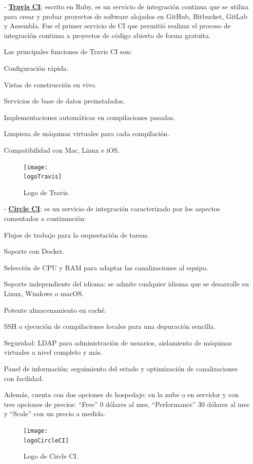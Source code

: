 \newpage

- \textbf{\underline{Travis CI}}: escrito en Ruby, es un servicio de integración continua que se utiliza para crear y probar proyectos de software alojados en GitHub, Bitbucket, GitLab y Assembla. Fue el primer servicio de CI que permitió realizar el proceso de integración continua a proyectos de código abierto de forma gratuita.

Las principales funciones de Travis CI son:
\begin{compactitem}
    \item Configuración rápida.
    \item Vistas de construcción en vivo.
    \item Servicios de base de datos preinstalados.
    \item Implementaciones automáticas en compilaciones pasadas.
    \item Limpieza de máquinas virtuales para cada compilación.
    \item Compatibilidad con Mac, Linux e iOS.
\end{compactitem}

\begin{figure}[h]
    \centering
    \texttt{[image: \\logoTravis]}
    \caption{Logo de Travis.}
\end{figure}

- \textbf{\underline{Circle CI}}: es un servicio de integración caracterizado por los aspectos comentados a continuación:
\begin{compactitem}
    \item Flujos de trabajo para la orquestación de tareas.
    \item Soporte con Docker.
    \item Selección de CPU y RAM para adaptar las canalizaciones al equipo.
    \item Soporte independiente del idioma: se admite cualquier idioma que se desarrolle en Linux, Windows o macOS.
    \item Potente almacenamiento en caché.
    \item SSH o ejecución de compilaciones locales para una depuración sencilla.
    \item Seguridad: LDAP para administración de usuarios, aislamiento de máquinas virtuales a nivel completo y más.
    \item Panel de información: seguimiento del estado y optimización de canalizaciones con facilidad.
\end{compactitem}
Además, cuenta con dos opciones de hospedaje: en la nube o en servidor y con tres opciones de precios: ``Free'' 0 dólares al mes, ``Performance'' 30 dólares al mes y ``Scale'' con un precio a medida.
\begin{figure}[h]
    \centering
    \texttt{[image: \\logoCircleCI]}
    \caption{Logo de Circle CI.}
\end{figure}

